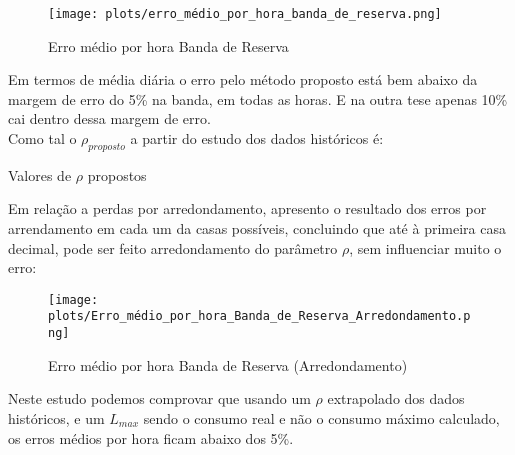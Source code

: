 \begin{figure}[H]
    \centering
    \texttt{[image: plots/erro\_médio\_por\_hora\_banda\_de\_reserva.png]}
    \caption{Erro médio por hora Banda de Reserva}
\end{figure}

Em termos de média diária o erro pelo método proposto está bem abaixo da margem de erro do 5\% na banda, em todas as horas. E na outra tese apenas 10\% cai dentro dessa margem de erro. \\

Como tal o $\rho_{proposto}$ a partir do estudo dos dados  históricos é: \

\begin{table}[H] \centering \caption{Valores de $\rho$ propostos}  \end{table}



Em relação a perdas por arredondamento, apresento o resultado dos erros por arrendamento em cada um da casas possíveis, concluindo que até à primeira casa decimal, pode ser feito arredondamento do parâmetro $\rho$, sem influenciar muito o erro: \\


\begin{figure}[H]
    \centering
    \texttt{[image: plots/Erro\_médio\_por\_hora\_Banda\_de\_Reserva\_Arredondamento.png]}
    \caption{Erro médio por hora Banda de Reserva (Arredondamento)}
\end{figure}



Neste estudo podemos comprovar que usando um $\rho$ extrapolado dos dados históricos, e um $L_{max}$ sendo o consumo real e não o consumo máximo calculado, os erros médios por hora ficam abaixo dos 5\%.\\